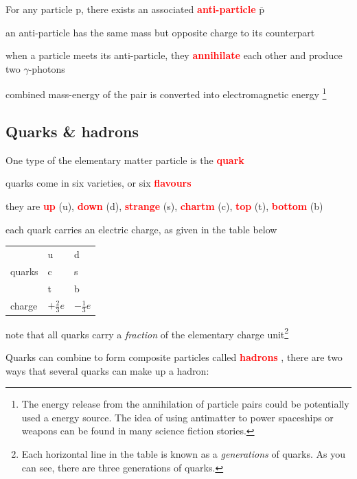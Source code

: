 \documentclass[a4paper,12pt]{book}
\newcommand{\cmt}{}
\newcommand{\keypoint}[1]{\textbf{\textcolor{red}{#1}}}
\newcommand{\keypoint}[1]{\textbf{\textcolor{red}{#1}}}
\newcommand{\cmt}{}
\begin{document}
For any particle $\text{p}$, there exists an associated \keypoint{anti-particle} $\bar{\text{p}}$

\cmt an anti-particle has the same mass but opposite charge to its counterpart

\cmt when a particle meets its anti-particle, they \keypoint{annihilate} each other and produce two $\gamma$-photons

combined mass-energy of the pair is converted into electromagnetic energy
\footnote{The energy release from the annihilation of  particle pairs could be potentially used a energy source. The idea of using antimatter to power spaceships or weapons can be found in many science fiction stories.}

\subsection{Quarks \& hadrons}

One type of the elementary matter particle is the \keypoint{quark}

\cmt quarks come in six varieties, or six \keypoint{flavours}

they are \keypoint{up} (u), \keypoint{down} (d), \keypoint{strange} (s), \keypoint{chartm} (c), \keypoint{top} (t), \keypoint{bottom} (b)

\cmt each quark carries an electric charge, as given in the table below

\begin{center}
	{\renewcommand{\arraystretch}{1.35}
		\begin{tabular}{|C{3cm}|C{2cm}|C{2cm}|}
			\hline  & u & d \\
			 quarks & c & s \\
			  & t & b \\
			\hline charge & $+\frac{2}{3}e$ & $-\frac{1}{3}e$ \\[3pt]
			\hline
		\end{tabular}
	}
\end{center}

note that all quarks carry a \emph{fraction} of the elementary charge unit\footnote{Each horizontal line in the table is known as a \emph{generations} of quarks. As you can see, there are three generations of quarks.}

Quarks can combine to form composite particles called \keypoint{hadrons} , there are two ways that several quarks can make up a hadron:
\end{document}
